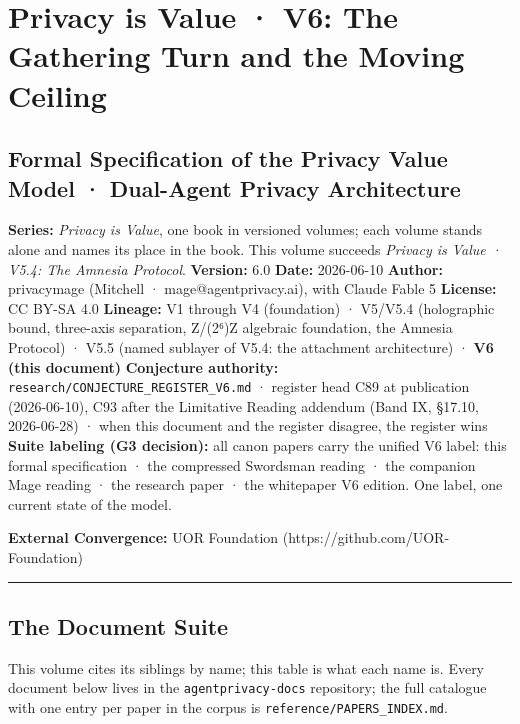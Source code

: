 \documentclass[
  11pt,
]{article}
\author{}
\date{}
\begin{document}
\section{Privacy is Value · V6: The Gathering Turn and the Moving
Ceiling}\label{privacy-is-value-v6-the-gathering-turn-and-the-moving-ceiling}

\subsection{Formal Specification of the Privacy Value Model · Dual-Agent
Privacy
Architecture}\label{formal-specification-of-the-privacy-value-model-dual-agent-privacy-architecture}

\textbf{Series:} \emph{Privacy is Value}, one book in versioned volumes;
each volume stands alone and names its place in the book. This volume
succeeds \emph{Privacy is Value · V5.4: The Amnesia Protocol}.
\textbf{Version:} 6.0 \textbf{Date:} 2026-06-10 \textbf{Author:}
privacymage (Mitchell · mage@agentprivacy.ai), with Claude Fable 5
\textbf{License:} CC BY-SA 4.0 \textbf{Lineage:} V1 through V4
(foundation) · V5/V5.4 (holographic bound, three-axis separation,
Z/(2⁶)Z algebraic foundation, the Amnesia Protocol) · V5.5 (named
sublayer of V5.4: the attachment architecture) · \textbf{V6 (this
document)} \textbf{Conjecture authority:}
\texttt{research/CONJECTURE\_REGISTER\_V6.md} · register head C89 at
publication (2026-06-10), C93 after the Limitative Reading addendum
(Band IX, §17.10, 2026-06-28) · when this document and the register
disagree, the register wins \textbf{Suite labeling (G3 decision):} all
canon papers carry the unified V6 label: this formal specification · the
compressed Swordsman reading · the companion Mage reading · the research
paper · the whitepaper V6 edition. One label, one current state of the
model.

\textbf{External Convergence:} UOR Foundation
(https://github.com/UOR-Foundation)

\begin{center}\rule{0.5\linewidth}{0.5pt}\end{center}

\subsection{The Document Suite}\label{the-document-suite}

This volume cites its siblings by name; this table is what each name is.
Every document below lives in the \texttt{agentprivacy-docs} repository;
the full catalogue with one entry per paper in the corpus is
\texttt{reference/PAPERS\_INDEX.md}.
\end{document}

